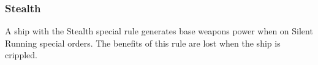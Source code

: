 \subsubsection{Stealth}
A ship with the Stealth special rule generates base weapons power when on Silent Running special orders. The benefits of this rule are lost when the ship is crippled.